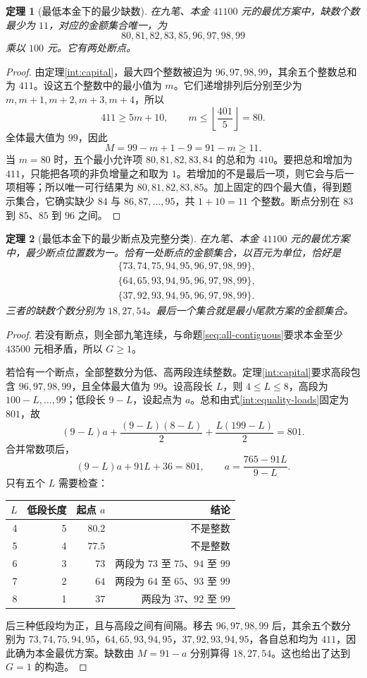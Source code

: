 \documentclass[UTF8,a4paper]{ctexbook}
\newtheorem{theorem}{定理}[chapter]
\theoremstyle{definition}
\numberwithin{equation}{chapter}
\newcommand{\1}{\mathbf{1}}
\begin{document}
\begin{theorem}[最低本金下的最少缺数]\label{seq:missing}
在九笔、本金 $41100$ 元的最优方案中，缺数个数最少为 $11$，对应的金额集合唯一，为
\[
80,81,82,83,85,96,97,98,99
\]
乘以 $100$ 元。它有两处断点。
\end{theorem}
\begin{proof}
由定理\ref{int:capital}，最大四个整数被迫为 $96,97,98,99$，其余五个整数总和为 $411$。设这五个整数中的最小值为 $m$。它们递增排列后分别至少为 $m,m+1,m+2,m+3,m+4$，所以
\[
411\ge5m+10,
\qquad m\le\left\lfloor\frac{401}{5}\right\rfloor=80.
\]
全体最大值为 $99$，因此
\[
M=99-m+1-9=91-m\ge11.
\]
当 $m=80$ 时，五个最小允许项 $80,81,82,83,84$ 的总和为 $410$。要把总和增加为 $411$，只能把各项的非负增量之和取为 $1$。若增加的不是最后一项，则它会与后一项相等；所以唯一可行结果为 $80,81,82,83,85$。加上固定的四个最大值，得到题示集合，它确实缺少 $84$ 与 $86,87,\ldots,95$，共 $1+10=11$ 个整数。断点分别在 $83$ 到 $85$、$85$ 到 $96$ 之间。
\end{proof}

\begin{theorem}[最低本金下的最少断点及完整分类]\label{seq:one-gap}
在九笔、本金 $41100$ 元的最优方案中，最少断点位置数为一。恰有一处断点的金额集合，以百元为单位，恰好是
\[
\begin{split}
&\{73,74,75,94,95,96,97,98,99\},\\
&\{64,65,93,94,95,96,97,98,99\},\\
&\{37,92,93,94,95,96,97,98,99\}.
\end{split}
\]
三者的缺数个数分别为 $18,27,54$。最后一个集合就是最小尾款方案的金额集合。
\end{theorem}
\begin{proof}
若没有断点，则全部九笔连续，与命题\ref{seq:all-contiguous}要求本金至少 $43500$ 元相矛盾，所以 $G\ge1$。

若恰有一个断点，全部整数分为低、高两段连续整数。定理\ref{int:capital}要求高段包含 $96,97,98,99$，且全体最大值为 $99$。设高段长 $L$，则 $4\le L\le8$，高段为 $100-L,\ldots,99$；低段长 $9-L$，设起点为 $a$。总和由式\eqref{int:equality-loads}固定为 $801$，故
\[
(9-L)a+\frac{(9-L)(8-L)}2+\frac{L(199-L)}2=801.
\]
合并常数项后，
\[
(9-L)a+91L+36=801,
\qquad a=\frac{765-91L}{9-L}.
\]
只有五个 $L$ 需要检查：
\begin{center}
\begin{tabular}{@{}rrrr@{}}
\toprule
$L$ & 低段长度 & 起点 $a$ & 结论\\
\midrule
4 & 5 & $80.2$ & 不是整数\\
5 & 4 & $77.5$ & 不是整数\\
6 & 3 & $73$ & 两段为 $73$ 至 $75$、$94$ 至 $99$\\
7 & 2 & $64$ & 两段为 $64$ 至 $65$、$93$ 至 $99$\\
8 & 1 & $37$ & 两段为 $37$、$92$ 至 $99$\\
\bottomrule
\end{tabular}
\end{center}
后三种低段均为正，且与高段之间有间隔。移去 $96,97,98,99$ 后，其余五个数分别为 $73,74,75,94,95$，$64,65,93,94,95$，$37,92,93,94,95$，各自总和均为 $411$，因此确为本金最优方案。缺数由 $M=91-a$ 分别算得 $18,27,54$。这也给出了达到 $G=1$ 的构造。
\end{proof}
\end{document}
